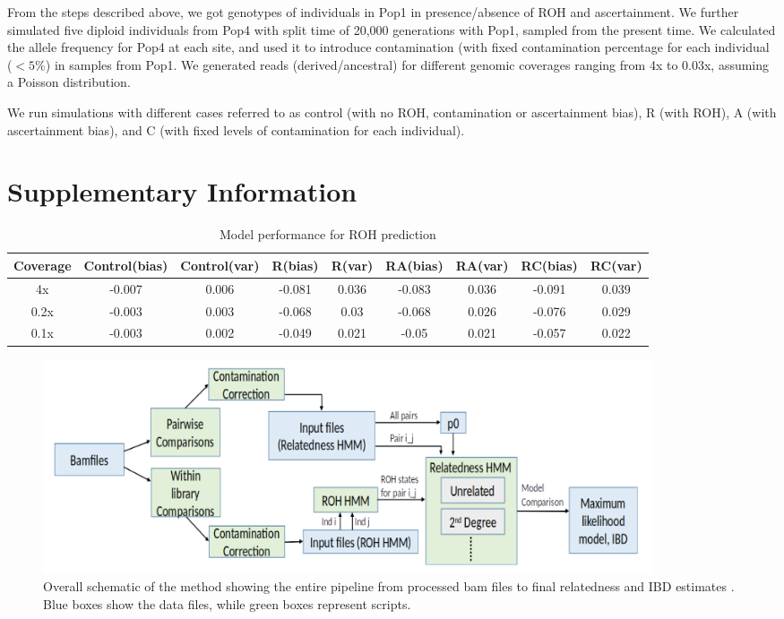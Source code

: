 \documentclass[12pt, letterpaper]{article}
\begin{document}
From the steps described above, we got genotypes of individuals in Pop1 in presence/absence of ROH and ascertainment. We further simulated five diploid individuals from Pop4 with split time of 20,000 generations with Pop1, sampled from the present time. We calculated the allele frequency for Pop4 at each site, and used it to introduce contamination (with fixed contamination percentage for each individual ($<5\%$) in samples from Pop1. We generated reads (derived/ancestral) for different genomic coverages ranging from 4x to 0.03x, assuming a Poisson distribution.

We run simulations with different cases referred to as control (with no ROH, contamination or ascertainment bias), R (with ROH), A (with ascertainment bias), and C (with fixed levels of contamination for each individual). 

\section{Supplementary Information}



\begin{table}
\caption{\label{tab:Table 2}Model performance for ROH prediction}
\begin{tabular}{|c|c|c|c|c|c|c|c|c|}
    \hline
    Coverage & Control(bias) & Control(var) & R(bias) & R(var) & RA(bias) & RA(var) & RC(bias) & RC(var)\\
    \hline
    4x & -0.007 & 0.006 & -0.081 & 0.036 & -0.083 & 0.036 & -0.091 & 0.039\\
    \hline
    0.2x & -0.003 & 0.003 & -0.068 & 0.03 & -0.068 & 0.026 & -0.076 & 0.029\\
    \hline
    0.1x & -0.003 & 0.002 & -0.049 & 0.021 & -0.05 & 0.021 & -0.057 & 0.022\\
    \hline
\end{tabular}
\label{table1}
\end{table}

\renewcommand{\figurename}{Fig. S}
\begin{figure}[h!]
    \includegraphics[width=18cm]{plots/inkscape_finalImg/schematic_sup.png}
    \centering
    \caption{Overall schematic of the method showing the entire pipeline from processed bam files to final relatedness and IBD estimates . Blue boxes show the data files, while green boxes represent scripts.}
    \label{figS0:schematic}
\end{figure}
\end{document}
